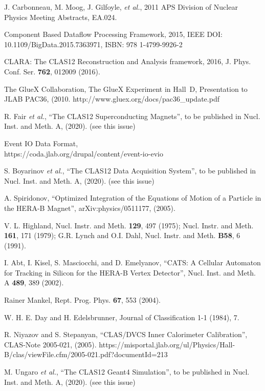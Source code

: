 \documentclass[3p,times,twocolumn]{elsarticle}
\begin{document}
\begin{thebibliography}{99}
J. Carbonneau, M. Moog,  J. Gilfoyle, {\it et al.}, 2011 APS Division of Nuclear Physics Meeting Abstracts, EA.024.

Component Based Dataflow Processing Framework, 2015, IEEE DOI: 10.1109/BigData.2015.7363971,
ISBN: 978 1-4799-9926-2

CLARA: The CLAS12 Reconstruction and Analysis framework, 2016, J. Phys. Conf. Ser. {\bf 762}, 012009 (2016).

The GlueX Collaboration, The GlueX Experiment in Hall~D, Presentation to JLAB PAC36, (2010.
http://www.gluex.org/docs/pac36\_update.pdf

R. Fair {\it et al.}, ``The CLAS12 Superconducting Magnets'', to be published in Nucl. Inst.
and Meth. A, (2020). (see this issue)

Event IO Data Format, \\ https://coda.jlab.org/drupal/content/event-io-evio

S. Boyarinov {\it et al.}, ``The CLAS12 Data Acquisition System'', to be published in Nucl. Inst. and
Meth. A, (2020). (see this issue)

  A. Spiridonov, ``Optimized Integration of the Equations of Motion of a Particle in the HERA-B Magnet'',
  arXiv:physics/0511177, (2005).

V. L. Highland, Nucl. Instr. and Meth. {\bf 129}, 497 (1975); Nucl. Instr. and Meth. {\bf 161}, 171 (1979);
G.R. Lynch and O.I. Dahl, Nucl. Instr. and Meth. {\bf B58}, 6 (1991).

I. Abt, I. Kisel, S. Masciocchi, and D. Emelyanov, ``CATS: A Cellular Automaton for Tracking in Silicon for the
HERA-B Vertex Detector'', Nucl. Inst. and Meth. A {\bf 489}, 389 (2002).

Rainer Mankel, Rept. Prog. Phys. {\bf 67}, 553 (2004).

W. H. E. Day and H. Edelsbrunner, Journal of Classification 1-1 (1984), 7. 

R. Niyazov and S. Stepanyan, ``CLAS/DVCS Inner Calorimeter Calibration'', CLAS-Note 2005-021, (2005).
https://misportal.jlab.org/ul/Physics/Hall-B/clas/viewFile.cfm/2005-021.pdf?documentId=213

M. Ungaro {\it et al.},  ``The CLAS12 Geant4 Simulation'', to be published in Nucl. Inst. and Meth. A, (2020).
(see this issue)


\end{thebibliography}
\end{document}
